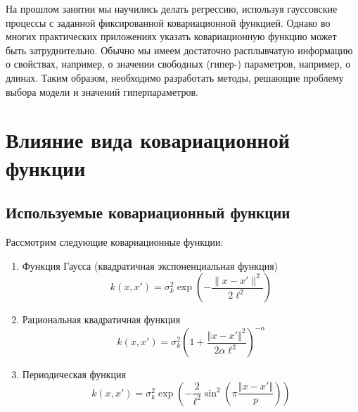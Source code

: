 \documentclass[11pt,a4paper]{article}
\providecommand{\tightlist}{%
      \setlength{\itemsep}{0pt}\setlength{\parskip}{0pt}}
\begin{document}
    На прошлом занятии мы научились делать регрессию, используя гауссовские
процессы с заданной фиксированной ковариационной функцией. Однако во
многих практических приложениях указать ковариационную функцию может
быть затруднительно. Обычно мы имеем достаточно расплывчатую информацию
о свойствах, например, о значении свободных (гипер-) параметров,
например, о длинах. Таким образом, необходимо разработать методы,
решающие проблему выбора модели и значений гиперпараметров.

    \hypertarget{ux432ux43bux438ux44fux43dux438ux435-ux432ux438ux434ux430-ux43aux43eux432ux430ux440ux438ux430ux446ux438ux43eux43dux43dux43eux439-ux444ux443ux43dux43aux446ux438ux438}{%
\section{Влияние вида ковариационной
функции}\label{ux432ux43bux438ux44fux43dux438ux435-ux432ux438ux434ux430-ux43aux43eux432ux430ux440ux438ux430ux446ux438ux43eux43dux43dux43eux439-ux444ux443ux43dux43aux446ux438ux438}}

    \hypertarget{ux438ux441ux43fux43eux43bux44cux437ux443ux435ux43cux44bux435-ux43aux43eux432ux430ux440ux438ux430ux446ux438ux43eux43dux43dux44bux439-ux444ux443ux43dux43aux446ux438ux438}{%
\subsection{Используемые ковариационный
функции}\label{ux438ux441ux43fux43eux43bux44cux437ux443ux435ux43cux44bux435-ux43aux43eux432ux430ux440ux438ux430ux446ux438ux43eux43dux43dux44bux439-ux444ux443ux43dux43aux446ux438ux438}}

Рассмотрим следующие ковариационные функции:

\begin{enumerate}
\def\labelenumi{\arabic{enumi}.}
\tightlist
\item
  Функция Гаусса (квадратичная экспоненциальная функция) \[
    k(x, x') = \sigma_k^2 \exp \left( -\frac{\lVert x - x' \rVert^2}{2\ell^2}  \right)
  \]
\item
  Рациональная квадратичная функция \[
    k(x, x') = \sigma_k^2 \left( 1 + \frac{ \left\Vert x - x' \right\Vert^2}{2 \alpha \ell^2} \right)^{-\alpha}
  \]
\item
  Периодическая функция \[
    k(x, x') = \sigma_k^2 \exp \left(-\frac{2}{\ell^2}\sin^2 \left( \pi \frac{\left\Vert x - x' \right\Vert}{p}\right) \right)
  \]
\end{enumerate}
\end{document}
